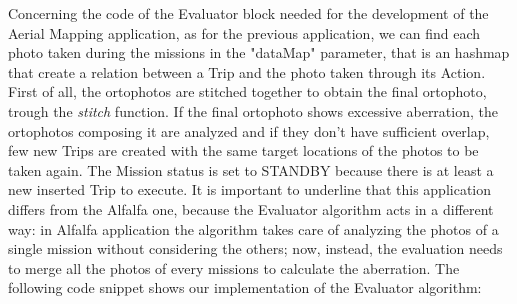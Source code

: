 Concerning the code of the Evaluator block needed for the development of the Aerial Mapping\cite{putti} application, as for the previous application, we can find each photo taken during the missions in the "dataMap" parameter, that is an hashmap that create a relation between a Trip and the photo taken through its Action.
First of all, the ortophotos are stitched together to obtain the final ortophoto, trough the \textit{stitch} function.
If the final ortophoto shows excessive aberration, the ortophotos composing it are analyzed and if they don't have sufficient overlap, few new Trips are created with the same target locations of the photos to be taken again. 
The Mission status is set to STANDBY because there is at least a new inserted Trip to execute.
It is important to underline that this application differs from the Alfalfa\cite{alfalfa} one, because the Evaluator algorithm acts in a different way: in Alfalfa\cite{alfalfa} application the algorithm takes care of analyzing the photos of a single mission without considering the others; now, instead, the evaluation needs to merge all the photos of every missions to calculate the aberration. 
The following code snippet shows our implementation of the Evaluator algorithm:
\\
